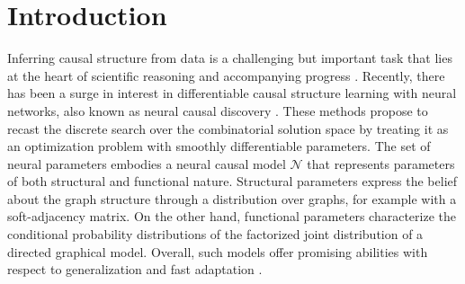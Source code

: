 \documentclass[nohyperref]{article}
\theoremstyle{plain}
\theoremstyle{definition}
\theoremstyle{remark}
\begin{document}
\printAffiliationsAndNotice{}  %

\begin{abstract}
Discovering causal structures from data is a challenging inference problem of fundamental importance in all areas of science. The appealing properties of neural networks have recently led to a surge of interest in differentiable neural network-based methods for learning causal structures from data. So far, differentiable causal discovery has focused on static datasets of observational or fixed interventional origin. In this work, we introduce an active intervention targeting (AIT) method which enables a quick identification of the underlying causal structure of the data-generating process. Our method significantly reduces the required number of interactions compared with random intervention targeting and is applicable for both discrete and continuous optimization formulations of learning the underlying directed acyclic graph (DAG) from data. We examine the proposed method across multiple frameworks in a wide range of settings and demonstrate superior performance on multiple benchmarks from simulated to real-world data. 
\end{abstract}

\section{Introduction} \label{sec:intro}
Inferring causal structure from data is a challenging but important task that lies at the heart of scientific reasoning and accompanying progress \citep{lauritzen1988local,friedman2000using,robins2000marginal, sachs2005causal,korb2010bayesian,hill2016inferring,vandenbroucke2016causality,de2019causality}. Recently, there has been a surge in interest in differentiable causal structure learning with neural networks, also known as neural causal discovery \citep{ke2019learning, scholkopf2021toward, xia2021causal}. These methods propose to recast the discrete search over the combinatorial solution space by treating it as an optimization problem with smoothly differentiable parameters. The set of neural parameters embodies a neural causal model $\mathcal{N}$ that represents parameters of both structural and functional nature. Structural parameters express the belief about the graph structure through a distribution over graphs, for example with a soft-adjacency matrix. On the other hand, functional parameters characterize the conditional probability distributions of the factorized joint distribution of a directed graphical model. Overall, such models offer promising abilities with respect to generalization and fast adaptation \citep{bengio2019meta}.
\end{document}
